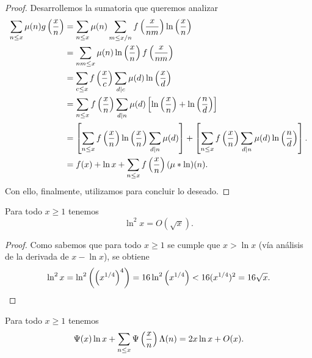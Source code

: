 \begin{proof}
  Desarrollemos la sumatoria que queremos analizar
  \begin{align*}
    \sum_{n \leq x} \mu(n) g\left( \frac{x}{n} \right)
    &= \sum_{n \leq x} \mu(n)
    \sum_{m \leq x/n} f\left( \frac{x}{nm} \right) \ln \left( \frac{x}{n} \right) \\
    &= \sum_{nm \leq x} \mu(n) \ln\left( \frac{x}{n} \right) f \left( \frac{x}{nm} \right) \\
    &= \sum_{c \leq x} f\left( \frac{x}{c} \right)
    \sum_{d \mid c} \mu(d) \ln\left( \frac{x}{d} \right) \\
    &= \sum_{n \leq x} f\left( \frac{x}{n} \right)
    \sum_{d \mid n} \mu(d)
    \left[ \ln \left( \frac{x}{n} \right) + \ln\left( \frac{n}{d} \right) \right] \\
    &= \left[ \sum_{n \leq x} f\left( \frac{x}{n} \right) \ln\left( \frac{x}{n} \right) \sum_{d \mid n} \mu(d) \right]
    +  \left[ \sum_{n \leq x} f\left( \frac{x}{n} \right) \sum_{d \mid n} \mu(d) \ln\left( \frac{n}{d} \right) \right].\\
    &= f(x) + \ln{x} + \sum_{n \leq x} f\left( \frac{x}{n} \right) (\mu * \ln)(n).
  \end{align*}
  Con ello, finalmente,
  utilizamos  para concluir lo deseado.
\end{proof}

\begin{lemma}
  \label{lem:ln2x-is-sqrtx}
  Para todo \(x \geq 1\) tenemos
  \[
    \ln^2 x = O(\sqrt{x}).
  \]
\end{lemma}

\begin{proof}
  Como sabemos que para todo \(x \geq 1\) se cumple que \(x > \ln x\)
  (v\'ia an\'alisis de la  derivada de \(x - \ln x\)), se obtiene
  \[
    \ln^2 x
    = \ln^2 \left( \left( x^{1/4} \right)^4 \right)
    = 16 \ln^2 \left( x^{1/4} \right)
    < 16 (x^{1/4})^2
    = 16 \sqrt{x}.
  \]
\end{proof}


\begin{lemma}
  \label{lem:2xlnx-ox}
  Para todo \(x \geq 1\) tenemos
  \[
    \Psi(x) \ln x + \sum_{n \leq x}
    \Psi\left( \frac{x}{n} \right)\Lambda(n) = 2x\ln x + O(x).
  \]
\end{lemma}


